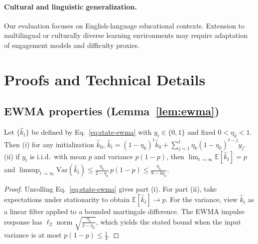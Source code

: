 \paragraph{Cultural and linguistic generalization.} Our evaluation focuses on English-language educational contexts. Extension to multilingual or culturally diverse learning environments may require adaptation of engagement models and difficulty proxies.

\section{Proofs and Technical Details}
\label{app:proofs}

\subsection{EWMA properties (Lemma~\ref{lem:ewma})}
\begin{lemma}
\label{lem:ewma}
Let $\{\widehat{k}_t\}$ be defined by Eq.~\eqref{eq:state-ewma} with $y_t\in\{0,1\}$ and fixed $0<\eta_k<1$. Then
(i) for any initialization $\widehat{k}_0$, $\widehat{k}_t = (1-\eta_k)^t \widehat{k}_0 + \sum_{j=1}^{t}\eta_k(1-\eta_k)^{t-j} y_j$.
(ii) if $y_t$ is i.i.d.\ with mean $p$ and variance $p(1-p)$, then $\lim_{t\to\infty}\mathbb{E}[\widehat{k}_t]=p$ and $\limsup_{t\to\infty}\mathrm{Var}(\widehat{k}_t)\le \frac{\eta_k}{2-\eta_k}\,p(1-p)\le \frac{\eta_k}{8-4\eta_k}$.
\end{lemma}

\begin{proof}
Unrolling Eq.~\eqref{eq:state-ewma} gives part (i). For part (ii), take expectations under stationarity to obtain $\mathbb{E}[\widehat{k}_t]\to p$. For the variance, view $\widehat{k}_t$ as a linear filter applied to a bounded martingale difference. The EWMA impulse response has $\ell_2$ norm $\sqrt{\frac{\eta_k}{2-\eta_k}}$, which yields the stated bound when the input variance is at most $p(1-p)\le \frac{1}{4}$.
\end{proof}

